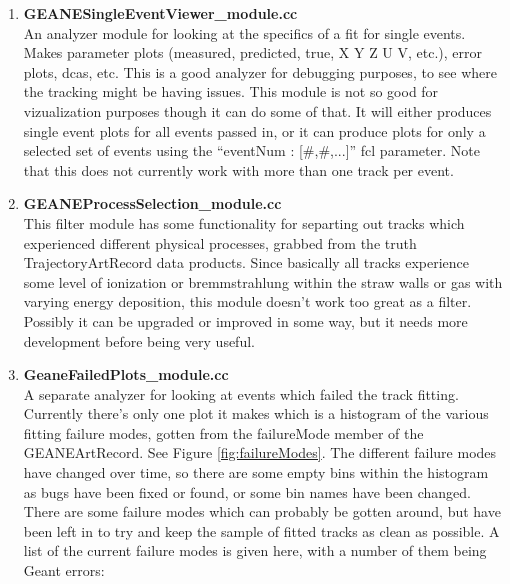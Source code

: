 \begin{enumerate}
      \item{\bf{GEANESingleEventViewer\_module.cc}} \\
      An analyzer module for looking at the specifics of a fit for single events. Makes parameter plots (measured, predicted, true, X Y Z U V, etc.), error plots, dcas, etc. This is a good analyzer for debugging purposes, to see where the tracking might be having issues. This module is not so good for vizualization purposes though it can do some of that. It will either produces single event plots for all events passed in, or it can produce plots for only a selected set of events using the ``eventNum : [\#,\#,...]'' fcl parameter. Note that this does not currently work with more than one track per event.

      \item{\bf{GEANEProcessSelection\_module.cc}} \\
      This filter module has some functionality for separting out tracks which experienced different physical processes, grabbed from the truth TrajectoryArtRecord data products. Since basically all tracks experience some level of ionization or bremmstrahlung within the straw walls or gas with varying energy deposition, this module doesn't work too great as a filter. Possibly it can be upgraded or improved in some way, but it needs more development before being very useful.

      \item{\bf{GeaneFailedPlots\_module.cc}} \\
      A separate analyzer for looking at events which failed the track fitting. Currently there's only one plot it makes which is a histogram of the various fitting failure modes, gotten from the failureMode member of the GEANEArtRecord. See Figure \ref{fig:failureModes}. The different failure modes have changed over time, so there are some empty bins within the histogram as bugs have been fixed or found, or some bin names have been changed. There are some failure modes which can probably be gotten around, but have been left in to try and keep the sample of fitted tracks as clean as possible. A list of the current failure modes is given here, with a number of them being Geant errors:

        \begin{itemize}


\end{itemize}
\end{enumerate}
